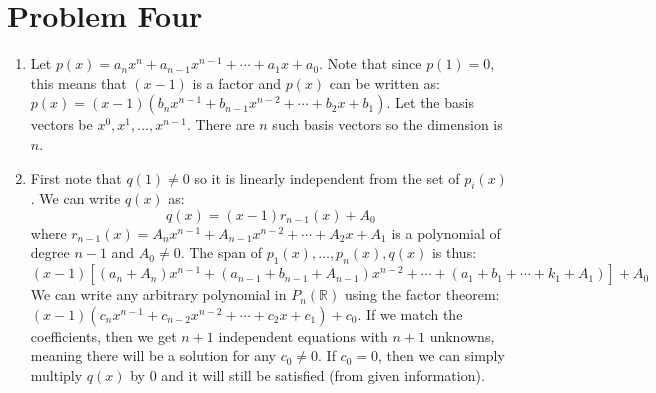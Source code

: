 \documentclass{article}
\begin{document}
\section*{Problem Four}
\begin{enumerate}[label=(\alph*)]
    \item Let $p(x) = a_nx^n + a_{n-1}x^{n-1} + \cdots + a_1x + a_0$. Note that since $p(1)=0$, this means that $(x-1)$ is a factor and $p(x)$ can be written as: $p(x)=(x-1)(b_nx^{n-1}+b_{n-1}x^{n-2}+\cdots + b_2x+b_1)$. Let the basis vectors be $x^0, x^1, \dots, x^{n-1}$. There are $n$ such basis vectors so the dimension is $n$.
    \item First note that $q(1) \neq 0$ so it is linearly independent from the set of $p_i(x)$. We can write $q(x)$ as:
    \begin{equation}
        q(x) = (x-1)r_{n-1}(x) + A_0
    \end{equation}
    where $r_{n-1}(x) = A_nx^{n-1} + A_{n-1}x^{n-2} + \cdots + A_2x+A_1$ is a polynomial of degree $n-1$ and $A_0 \neq 0$. The span of $p_1(x),\dots, p_n(x), q(x)$ is thus:
    \begin{equation}
        (x-1)\left[(a_n + A_n) x^{n-1} + (a_{n-1} + b_{n-1} + A_{n-1}) x^{n-2} + \cdots + (a_1 + b_1 + \cdots +k_1 + A_1)\right] + A_0
    \end{equation}
    We can write any arbitrary polynomial in $P_n(\mathbb{R})$ using the factor theorem: $(x-1)(c_nx^{n-1}+c_{n-2}x^{n-2}+\cdots + c_2x + c_1) + c_0$. If we match the coefficients, then we get $n+1$ independent equations with $n+1$ unknowns, meaning there will be a solution for any $c_0 \neq 0$. If $c_0 = 0$, then we can simply multiply $q(x)$ by $0$ and it will still be satisfied (from given information).
\end{enumerate}
\end{document}
